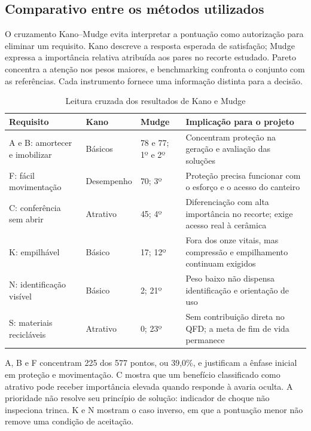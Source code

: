 \subsection{Comparativo entre os métodos utilizados}
\label{sec:comparativo-metodos}

O cruzamento Kano--Mudge evita interpretar a pontuação como autorização para eliminar um requisito. Kano descreve a resposta esperada de satisfação; Mudge expressa a importância relativa atribuída aos pares no recorte estudado. Pareto concentra a atenção nos pesos maiores, e benchmarking confronta o conjunto com as referências. Cada instrumento fornece uma informação distinta para a decisão.

\begin{table}[H]
\caption{Leitura cruzada dos resultados de Kano e Mudge}
\label{tab:cruzamento-kano-mudge}
\centering\scriptsize
\begin{tabularx}{\textwidth}{L{3.8cm}L{1.8cm}L{1.9cm}Y}
\toprule\textbf{Requisito}&\textbf{Kano}&\textbf{Mudge}&\textbf{Implicação para o projeto}\\\midrule
A e B: amortecer e imobilizar&Básicos&78 e 77; 1º e 2º&Concentram proteção na geração e avaliação das soluções\\
F: fácil movimentação&Desempenho&70; 3º&Proteção precisa funcionar com o esforço e o acesso do canteiro\\
C: conferência sem abrir&Atrativo&45; 4º&Diferenciação com alta importância no recorte; exige acesso real à cerâmica\\
K: empilhável&Básico&17; 12º&Fora dos onze vitais, mas compressão e empilhamento continuam exigidos\\
N: identificação visível&Básico&2; 21º&Peso baixo não dispensa identificação e orientação de uso\\
S: materiais recicláveis&Atrativo&0; 23º&Sem contribuição direta no QFD; a meta de fim de vida permanece\\
\bottomrule\end{tabularx}
\end{table}

A, B e F concentram 225 dos 577 pontos, ou 39,0\%, e justificam a ênfase inicial em proteção e movimentação. C mostra que um benefício classificado como atrativo pode receber importância elevada quando responde à avaria oculta. A prioridade não resolve seu princípio de solução: indicador de choque não inspeciona trinca. K e N mostram o caso inverso, em que a pontuação menor não remove uma condição de aceitação.

